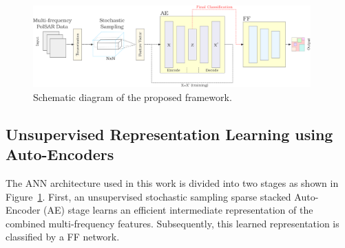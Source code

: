 

%
%
%
%
%





\begin{figure}[!h] 
	\centering
	\includegraphics[width=0.95\textwidth]{Figures/Kron/AE}
	\caption{Schematic diagram of the proposed framework.}
	\label{fig:ANN}
\end{figure}

\subsection{Unsupervised Representation Learning using Auto-Encoders}

\label{sec:ANN}
The ANN architecture used in this work is divided into two stages as shown in Figure~\ref{fig:ANN}. 
First, an unsupervised stochastic sampling sparse stacked Auto-Encoder (AE) stage learns an efficient intermediate representation of the combined multi-frequency features. Subsequently, this learned representation is classified by a FF network. 

